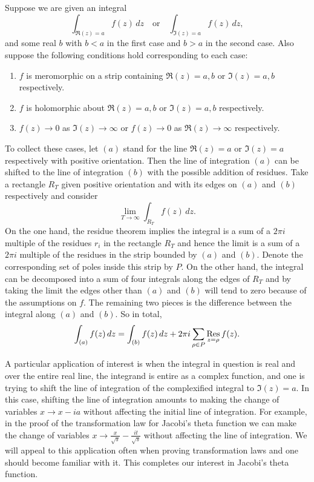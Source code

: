       \begin{method}
        Suppose we are given an integral
        \[
          \int_{\Re(z) = a}f(z)\,dz \quad \text{or} \quad \int_{\Im(z) = a}f(z)\,dz,
        \]
        and some real $b$ with $b < a$ in the first case and $b > a$ in the second case. Also suppose the following conditions hold corresponding to each case:
        \begin{enumerate}[label=(\roman*)]
          \item $f$ is meromorphic on a strip containing $\Re(z) = a,b$ or $\Im(z) = a,b$ respectively.
          \item $f$ is holomorphic about $\Re(z) = a,b$ or $\Im(z) = a,b$ respectively.
          \item $f(z) \to 0$ as $\Im(z) \to \infty$ or $f(z) \to 0$ as $\Re(z) \to \infty$ respectively.
        \end{enumerate}
        To collect these cases, let $(a)$ stand for the line $\Re(z) = a$ or $\Im(z) = a$ respectively with positive orientation. Then the line of integration $(a)$ can be shifted to the line of integration $(b)$ with the possible addition of residues. Take a rectangle $R_{T}$ given positive orientation and with its edges on $(a)$ and $(b)$ respectively and consider
        \[
          \lim_{T \to \infty}\int_{R_{T}}f(z)\,dz.
        \]
        On the one hand, the residue theorem implies the integral is a sum of a $2\pi i$ multiple of the residues $r_{i}$ in the rectangle $R_{T}$ and hence the limit is a sum of a $2\pi i$ multiple of the residues in the strip bounded by $(a)$ and $(b)$. Denote the corresponding set of poles inside this strip by $P$. On the other hand, the integral can be decomposed into a sum of four integrals along the edges of $R_{T}$ and by taking the limit the edges other than $(a)$ and $(b)$ will tend to zero because of the assumptions on $f$. The remaining two pieces is the difference between the integral along $(a)$ and $(b)$. So in total,
        \[
          \int_{(a)}f(z)\,dz = \int_{(b)}f(z)\,dz+2\pi i\sum_{\rho \in P}\operatorname*{\mathrm{Res}}_{z = \rho}f(z).
        \]
      \end{method}

      A particular application of interest is when the integral in question is real and over the entire real line, the integrand is entire as a complex function, and one is trying to shift the line of integration of the complexified integral to $\Im(z) = a$. In this case, shifting the line of integration amounts to making the change of variables $x \to x-ia$ without affecting the initial line of integration. For example, in the proof of the transformation law for Jacobi's theta function we can make the change of variables $x \to \frac{x}{\sqrt{s}}-\frac{it}{\sqrt{s}}$ without affecting the line of integration. We will appeal to this application often when proving transformation laws and one should become familiar with it. This completes our interest in Jacobi's theta function.
